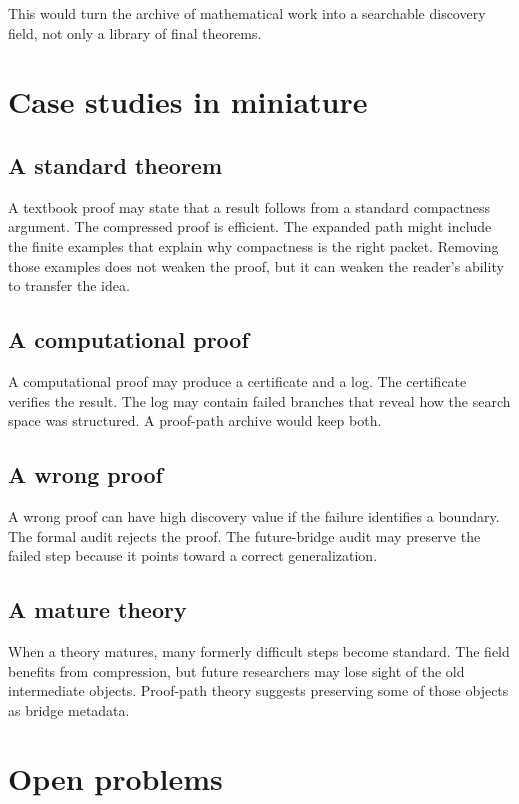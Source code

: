 \documentclass[11pt,oneside]{book}
\theoremstyle{remark}
\begin{document}
This would turn the archive of mathematical work into a searchable discovery field, not only a library of final theorems.

\section{Case studies in miniature}

\subsection{A standard theorem}
A textbook proof may state that a result follows from a standard compactness argument.  The compressed proof is efficient.  The expanded path might include the finite examples that explain why compactness is the right packet.  Removing those examples does not weaken the proof, but it can weaken the reader's ability to transfer the idea.

\subsection{A computational proof}
A computational proof may produce a certificate and a log.  The certificate verifies the result.  The log may contain failed branches that reveal how the search space was structured.  A proof-path archive would keep both.

\subsection{A wrong proof}
A wrong proof can have high discovery value if the failure identifies a boundary.  The formal audit rejects the proof.  The future-bridge audit may preserve the failed step because it points toward a correct generalization.

\subsection{A mature theory}
When a theory matures, many formerly difficult steps become standard.  The field benefits from compression, but future researchers may lose sight of the old intermediate objects.  Proof-path theory suggests preserving some of those objects as bridge metadata.

\section{Open problems}
\end{document}
